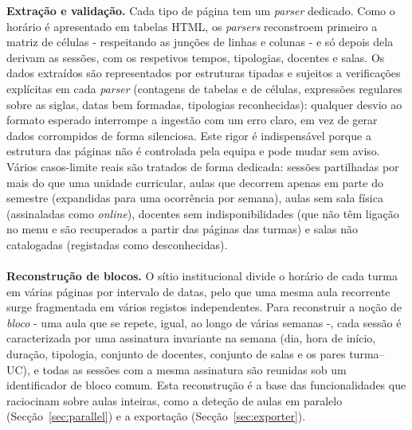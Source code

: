 \documentclass[10pt]{article}
\begin{document}
    \textbf{Extração e validação.} Cada tipo de página tem um \emph{parser} dedicado. Como o horário é apresentado em tabelas HTML, os \emph{parsers} reconstroem primeiro a matriz de células - respeitando as junções de linhas e colunas - e só depois dela derivam as sessões, com os respetivos tempos, tipologias, docentes e salas. Os dados extraídos são representados por estruturas tipadas e sujeitos a verificações explícitas em cada \emph{parser} (contagens de tabelas e de células, expressões regulares sobre as siglas, datas bem formadas, tipologias reconhecidas): qualquer desvio ao formato esperado interrompe a ingestão com um erro claro, em vez de gerar dados corrompidos de forma silenciosa. Este rigor é indispensável porque a estrutura das páginas não é controlada pela equipa e pode mudar sem aviso. Vários casos-limite reais são tratados de forma dedicada: sessões partilhadas por mais do que uma unidade curricular, aulas que decorrem apenas em parte do semestre (expandidas para uma ocorrência por semana), aulas sem sala física (assinaladas como \emph{online}), docentes sem indisponibilidades (que não têm ligação no menu e são recuperados a partir das páginas das turmas) e salas não catalogadas (registadas como desconhecidas).
    \\\\
    \textbf{Reconstrução de blocos.} O sítio institucional divide o horário de cada turma em várias páginas por intervalo de datas, pelo que uma mesma aula recorrente surge fragmentada em vários registos independentes. Para reconstruir a noção de \emph{bloco} - uma aula que se repete, igual, ao longo de várias semanas -, cada sessão é caracterizada por uma assinatura invariante na semana (dia, hora de início, duração, tipologia, conjunto de docentes, conjunto de salas e os pares turma--UC), e todas as sessões com a mesma assinatura são reunidas sob um identificador de bloco comum. Esta reconstrução é a base das funcionalidades que raciocinam sobre aulas inteiras, como a deteção de aulas em paralelo (Secção~\ref{sec:parallel}) e a exportação (Secção~\ref{sec:exporter}).
    \\\\
\end{document}
